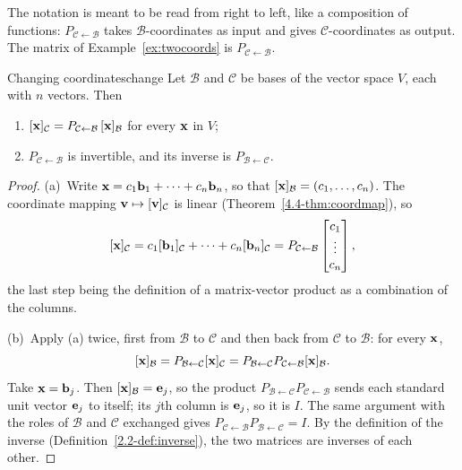 \documentclass[11pt]{article}
\begin{document}
The notation is meant to be read from right to left, like a composition of functions: $P_{\mathcal{C}\leftarrow\mathcal{B}}$ takes $\mathcal{B}$-coordinates as input and gives $\mathcal{C}$-coordinates as output. The matrix of Example~\ref{ex:twocoords} is $P_{\mathcal{C}\leftarrow\mathcal{B}}$.

\begin{thm}{Changing coordinates}{change}
Let $\mathcal{B}$ and $\mathcal{C}$ be bases of the vector space $V$, each with $n$ vectors. Then
\begin{enumerate}[label=(\alph*),itemsep=1pt]
  \item $[\mathbf{x}]_{\mathcal{C}}=P_{\mathcal{C}\leftarrow\mathcal{B}}\,[\mathbf{x}]_{\mathcal{B}}$ for every $\mathbf{x}$ in $V$;
  \item $P_{\mathcal{C}\leftarrow\mathcal{B}}$ is invertible, and its inverse is $P_{\mathcal{B}\leftarrow\mathcal{C}}$.
\end{enumerate}
\end{thm}

\begin{proof}
(a)~Write $\mathbf{x}=c_1\mathbf{b}_1+\cdots+c_n\mathbf{b}_n$, so that $[\mathbf{x}]_{\mathcal{B}}=(c_1,\dots,c_n)$. The coordinate mapping $\mathbf{v}\mapsto[\mathbf{v}]_{\mathcal{C}}$ is linear (Theorem~\ref{4.4-thm:coordmap}), so
\[
[\mathbf{x}]_{\mathcal{C}}=c_1[\mathbf{b}_1]_{\mathcal{C}}+\cdots+c_n[\mathbf{b}_n]_{\mathcal{C}}=P_{\mathcal{C}\leftarrow\mathcal{B}}\begin{bmatrix}c_1\\\vdots\\c_n\end{bmatrix},
\]
the last step being the definition of a matrix-vector product as a combination of the columns.

(b)~Apply (a) twice, first from $\mathcal{B}$ to $\mathcal{C}$ and then back from $\mathcal{C}$ to $\mathcal{B}$: for every $\mathbf{x}$,
\[
[\mathbf{x}]_{\mathcal{B}}=P_{\mathcal{B}\leftarrow\mathcal{C}}[\mathbf{x}]_{\mathcal{C}}=P_{\mathcal{B}\leftarrow\mathcal{C}}P_{\mathcal{C}\leftarrow\mathcal{B}}[\mathbf{x}]_{\mathcal{B}}.
\]
Take $\mathbf{x}=\mathbf{b}_j$. Then $[\mathbf{x}]_{\mathcal{B}}=\mathbf{e}_j$, so the product $P_{\mathcal{B}\leftarrow\mathcal{C}}P_{\mathcal{C}\leftarrow\mathcal{B}}$ sends each standard unit vector $\mathbf{e}_j$ to itself; its $j$th column is $\mathbf{e}_j$, so it is $I$. The same argument with the roles of $\mathcal{B}$ and $\mathcal{C}$ exchanged gives $P_{\mathcal{C}\leftarrow\mathcal{B}}P_{\mathcal{B}\leftarrow\mathcal{C}}=I$. By the definition of the inverse (Definition~\ref{2.2-def:inverse}), the two matrices are inverses of each other.
\end{proof}
\end{document}
